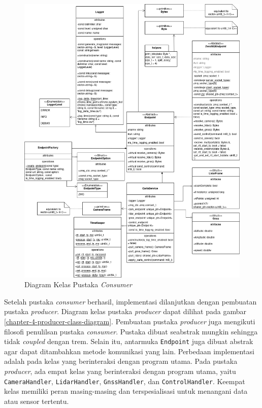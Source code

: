 \begin{figure}[h!]
    \centering
    \includegraphics[width=1.0\textwidth]{resources/chapter-4/consumer-class_diagram.png}
	\caption{Diagram Kelas Pustaka \textit{Consumer}}
    \label{chapter-4-consumer-class-diagram}
\end{figure}

Setelah pustaka \textit{consumer} berhasil, implementasi dilanjutkan dengan
pembuatan pustaka \textit{producer}. Diagram kelas pustaka \textit{producer}
dapat dilihat pada gambar \ref{chapter-4-producer-class-diagram}. Pembuatan
pustaka \textit{producer} juga mengikuti filosofi penulilsan pustaka
\textit{consumer}. Pustaka dibuat seabstrak mungkin sehingga tidak
\textit{coupled} dengan trem. Selain itu, antarmuka \texttt{Endpoint} juga
dibuat abstrak agar dapat ditambahkan metode komunikasi yang lain. Perbedaan
implementasi adalah pada kelas yang berinteraksi dengan program utama. Pada
pustaka \textit{producer}, ada empat kelas yang berinteraksi dengan program
utama, yaitu \texttt{CameraHandler}, \texttt{LidarHandler},
\texttt{GnssHandler}, dan \texttt{ControlHandler}. Keempat kelas memiliki peran
masing-masing dan terspesialisasi untuk menangani data atau sensor tertentu.

